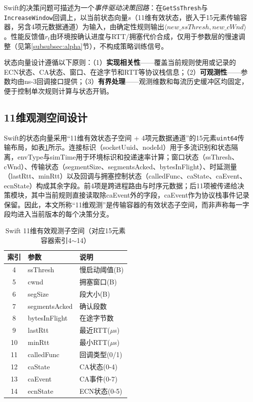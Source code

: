 \documentclass[10pt,twocolumn]{article}
\begin{document}
Swift的决策问题可描述为一个\emph{事件驱动决策回路}：在\texttt{GetSsThresh}与\texttt{IncreaseWindow}回调上，以当前状态向量$s$（11维有效状态，嵌入于15元素传输容器，另含4项元数据通道）为输入，由确定性规则输出$\langle new\_ssThresh, new\_cWnd \rangle$。性能反馈值$r_t$由环境按确认进度与RTT/拥塞代价合成，仅用于参数层的慢速调整（见第\ref{subsubsec:alpha}节），不构成策略训练信号。

状态向量设计遵循以下原则：（1）\textbf{实现相关性}——覆盖当前规则使用或记录的ECN状态、CA状态、窗口、在途字节和RTT等协议栈信息；（2）\textbf{可观测性}——参数均由ns-3回调接口提供；（3）\textbf{有界处理}——观测维数和每流历史缓冲区均固定，便于控制单次规则计算与状态开销。

\subsection{11维观测空间设计}

Swift的状态向量采用“11维有效状态子空间 + 4项元数据通道”的15元素\texttt{uint64}传输布局，如表\ref{tab:observation}所示。连接标识（socketUuid、nodeId）用于多流识别和状态隔离，envType与simTime用于环境标识和投递速率计算；窗口状态（ssThresh、cWnd）、传输状态（segmentSize、segmentsAcked、bytesInFlight）、时延测量（lastRtt、minRtt）以及回调与拥塞控制状态（calledFunc、caState、caEvent、ecnState）构成其余字段。前4项是跨进程路由与时序元数据；后11项被传递给决策模块，其中当前规则直接读取除caEvent外的字段，caEvent作为协议栈事件记录保留。因此，本文所称“11维观测”是传输容器的有效状态子空间，而非声称每一字段均进入当前版本的每个决策分支。

\begin{table}[htbp]
\centering
\caption{Swift 11维有效观测子空间（对应15元素容器索引4$\sim$14）}
\label{tab:observation}
\small
\begin{tabular}{clp{3.2cm}}
\toprule
\textbf{索引} & \textbf{参数} & \textbf{说明} \\
\midrule
4  & ssThresh & 慢启动阈值(B) \\
5  & cwnd & 拥塞窗口(B) \\
6  & segSize & 段大小(B) \\
7  & segmentsAcked & 确认段数 \\
8  & bytesInFlight & 在途字节数 \\
9  & lastRtt & 最近RTT($\mu$s) \\
10 & minRtt & 最小RTT($\mu$s) \\
11 & calledFunc & 回调类型(0/1) \\
12 & caState & CA状态(0-4) \\
13 & caEvent & CA事件(0-7) \\
14 & ecnState & ECN状态(0-5) \\
\bottomrule
\end{tabular}
\end{table}
\end{document}
